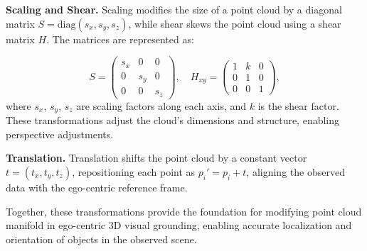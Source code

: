 \noindent\textbf{Scaling and Shear.}
Scaling modifies the size of a point cloud by a diagonal matrix \( S = \text{diag}(s_x, s_y, s_z) \), while shear skews the point cloud using a shear matrix \( H \). The matrices are represented as:

\begin{equation}
    S = 
    \left(
    \begin{matrix}
        s_x & 0 & 0 \\
        0 & s_y & 0 \\
        0 & 0 & s_z
    \end{matrix}
    \right), \quad
    H_{xy} = 
    \left(
    \begin{matrix}
        1 & k & 0 \\
        0 & 1 & 0 \\
        0 & 0 & 1
    \end{matrix}
    \right),
\end{equation}
where \( s_x \), \( s_y \), \( s_z \) are scaling factors along each axis, and \( k \) is the shear factor. These transformations adjust the cloud's dimensions and structure, enabling perspective adjustments.

\noindent\textbf{Translation.}
Translation shifts the point cloud by a constant vector \( t = (t_x, t_y, t_z) \), repositioning each point as \( p_i' = p_i + t \), aligning the observed data with the ego-centric reference frame.

Together, these transformations provide the foundation for modifying point cloud manifold in ego-centric 3D visual grounding, enabling accurate localization and orientation of objects in the observed scene.





